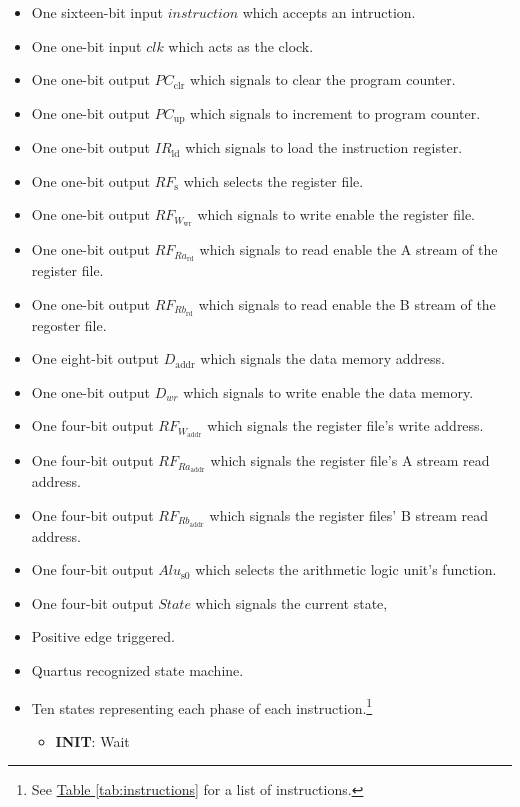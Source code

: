 \begin{itemize}
    \item One sixteen-bit input $instruction$ which accepts an intruction.
    \item One one-bit input $clk$ which acts as the clock.
    \item One one-bit output $PC_\text{clr}$ which signals to clear the program counter.
    \item One one-bit output $PC_\text{up}$ which signals to increment to program counter.
    \item One one-bit output $IR_\text{ld}$ which signals to load the instruction register.
    \item One one-bit output $RF_\text{s}$ which selects the register file.
    \item One one-bit output $RF_{W_\text{wr}}$ which signals to write enable the register file.
    \item One one-bit output $RF_{Ra_\text{rd}}$ which signals to read enable the A stream of the register file.
    \item One one-bit output $RF_{Rb_\text{rd}}$ which signals to read enable the B stream of the regoster file.
    \item One eight-bit output $D_\text{addr}$ which signals the data memory address.
    \item One one-bit output $D_{wr}$ which signals to write enable the data memory.
    \item One four-bit output $RF_{W_\text{addr}}$ which signals the register file's write address.
    \item One four-bit output $RF_{Ra_\text{addr}}$ which signals the register file's A stream read address.
    \item One four-bit output $RF_{Rb_\text{addr}}$ which signals the register files' B stream read address.
    \item One four-bit output $Alu_\text{s0}$ which selects the arithmetic logic unit's function.
    \item One four-bit output $State$ which signals the current state,
    \item Positive edge triggered.
    \item Quartus recognized state machine.
    \item Ten states representing each phase of each instruction.\footnote{See \hyperref[tab:instructions]{Table \ref*{tab:instructions}} for a list of instructions.}
    \begin{itemize}
        \item \textbf{INIT}: Wait

\end{itemize}
\end{itemize}
